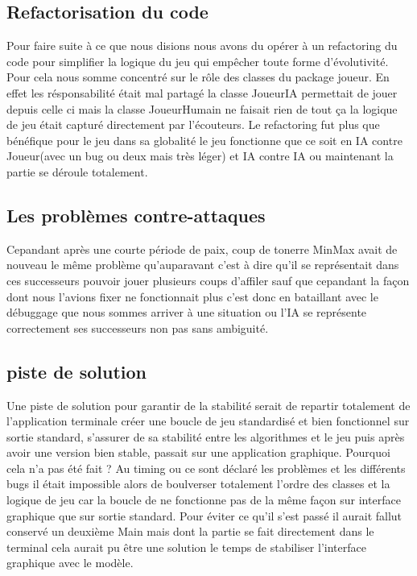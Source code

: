 \documentclass[12pt, legalpaper]{article}
\begin{document}
\subsection{Refactorisation du code}

Pour faire suite à ce que nous disions nous avons du opérer à un refactoring du code pour simplifier la logique du jeu qui empêcher toute forme d'évolutivité. Pour cela nous somme concentré sur le rôle des classes du package joueur. En effet les résponsabilité était mal partagé la classe JoueurIA permettait de jouer depuis celle ci mais la classe JoueurHumain ne faisait rien de tout ça la logique de jeu était capturé directement par l'écouteurs. Le refactoring fut plus que bénéfique pour le jeu dans sa globalité le jeu fonctionne que ce soit en IA contre Joueur(avec un bug ou deux mais très léger) et IA contre IA ou maintenant la partie se déroule totalement.

\subsection{Les problèmes contre-attaques}

Cepandant après une courte période de paix, coup de tonerre MinMax avait de nouveau le même problème qu'auparavant c'est à dire qu'il se représentait dans ces successeurs pouvoir jouer plusieurs coups d'affiler sauf que cepandant la façon dont nous l'avions fixer ne fonctionnait plus c'est donc en bataillant avec le débuggage que nous sommes arriver à une situation ou l'IA se représente correctement ses successeurs non pas sans ambiguité.

\subsection{piste de solution}

Une piste de solution pour garantir de la stabilité serait de repartir totalement de l'application terminale créer une boucle de jeu standardisé et bien fonctionnel sur sortie standard, s'assurer de sa stabilité entre les algorithmes et le jeu puis après avoir une version bien stable, passait sur une application graphique. Pourquoi cela n'a pas été fait ? Au timing ou ce sont déclaré les problèmes et les différents bugs il était impossible alors de boulverser totalement l'ordre des classes et la logique de jeu car la boucle de ne fonctionne pas de la même façon sur interface graphique que sur sortie standard. Pour éviter ce qu'il s'est passé il aurait fallut conservé un deuxième Main mais dont la partie se fait directement dans le terminal cela aurait pu être une solution le temps de stabiliser l'interface graphique avec le modèle.
\end{document}

